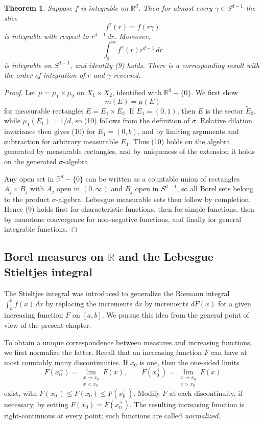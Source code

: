 \documentclass[11pt,openany]{book}
\newtheorem{theorem}{Theorem}[section]
\begin{document}
\begin{theorem}
Suppose $f$ is integrable on $\mathbb R^d$. Then for almost every $\gamma\in S^{d-1}$ the slice
\[
f^\gamma(r)=f(r\gamma)
\]
is integrable with respect to $r^{d-1}\,dr$. Moreover,
\[
\int_0^\infty f^\gamma(r)r^{d-1}\,dr
\]
is integrable on $S^{d-1}$, and identity (9) holds. There is a corresponding result with the order of integration of $r$ and $\gamma$ reversed.
\end{theorem}

\begin{proof}
Let $\mu=\mu_1\times\mu_2$ on $X_1\times X_2$, identified with $\mathbb R^d-\{0\}$. We first show
\begin{equation}
m(E)=\mu(E)
\tag{10}
\end{equation}
for measurable rectangles $E=E_1\times E_2$. If $E_1=(0,1)$, then $E$ is the sector $\widetilde E_2$, while $\mu_1(E_1)=1/d$, so (10) follows from the definition of $\sigma$. Relative dilation invariance then gives (10) for $E_1=(0,b)$, and by limiting arguments and subtraction for arbitrary measurable $E_1$. Thus (10) holds on the algebra generated by measurable rectangles, and by uniqueness of the extension it holds on the generated $\sigma$-algebra.

Any open set in $\mathbb R^d-\{0\}$ can be written as a countable union of rectangles $A_j\times B_j$ with $A_j$ open in $(0,\infty)$ and $B_j$ open in $S^{d-1}$, so all Borel sets belong to the product $\sigma$-algebra. Lebesgue measurable sets then follow by completion. Hence (9) holds first for characteristic functions, then for simple functions, then by monotone convergence for non-negative functions, and finally for general integrable functions.
\end{proof}

\subsection{Borel measures on $\mathbb R$ and the Lebesgue--Stieltjes integral}

The Stieltjes integral was introduced to generalize the Riemann integral $\int_a^b f(x)\,dx$ by replacing the increments $dx$ by increments $dF(x)$ for a given increasing function $F$ on $[a,b]$. We pursue this idea from the general point of view of the present chapter.

To obtain a unique correspondence between measures and increasing functions, we first normalize the latter. Recall that an increasing function $F$ can have at most countably many discontinuities. If $x_0$ is one, then the one-sided limits
\[
F(x_0^-)=\lim_{\substack{x\to x_0\\x<x_0}}F(x),
\qquad
F(x_0^+)=\lim_{\substack{x\to x_0\\x>x_0}}F(x)
\]
exist, with $F(x_0^-)\leq F(x_0)\leq F(x_0^+)$. Modify $F$ at each discontinuity, if necessary, by setting $F(x_0)=F(x_0^+)$. The resulting increasing function is right-continuous at every point; such functions are called \emph{normalized}.
\end{document}
